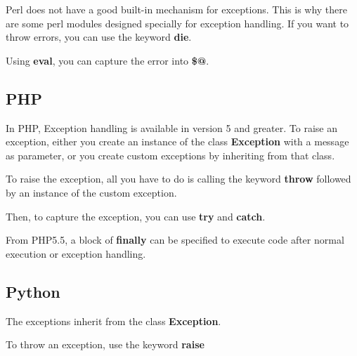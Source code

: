 \documentclass{KodeBook}
\begin{document}
Perl does not have a good built-in mechanism for exceptions. 
This is why there are some perl modules designed specially for exception handling.
If you want to throw errors, you can use the keyword \textbf{die}. 



Using \textbf{eval}, you can capture the error into \textbf{\$@}.



\subsection{PHP}

In PHP, Exception handling is available in version 5 and greater.
To raise an exception, either you create an instance of the class \textbf{Exception} with a message as parameter, 
or you create custom exceptions by inheriting from that class.



To raise the exception, all you have to do is calling the keyword \textbf{throw} followed by an instance of the custom exception.



Then, to capture the exception, you can use \textbf{try} and \textbf{catch}.



From PHP5.5, a block of \textbf{finally} can be specified to execute code after normal execution or exception handling.

\subsection{Python}

The exceptions inherit from the class \textbf{Exception}.



To throw an exception, use the keyword \textbf{raise}


\end{document}
